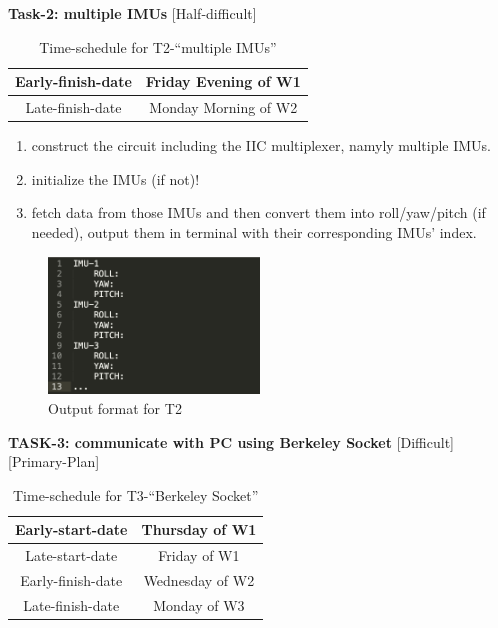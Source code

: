 \documentclass[11pt, a4paper]{article}
\begin{document}
\textbf{Task-2: multiple IMUs} 	[Half-difficult]
\begin{table}[!ht]
	\centering
	\caption{Time-schedule for T2-``multiple IMUs''}
	\begin{tabular}{|c|c|}
		\hline
		Early-finish-date & Friday Evening of W1 \\ \hline
		Late-finish-date & Monday Morning of W2 \\ \hline
	\end{tabular}
	\label{tab:HD_TASK_2}
\end{table}

\begin{enumerate}
	\item construct the circuit including the IIC multiplexer, namyly multiple IMUs.
	\item initialize the IMUs (if not)!
	\item fetch data from those IMUs and then convert them into roll/yaw/pitch (if needed), output them in terminal with their corresponding IMUs' index.
\end{enumerate}

\begin{figure}[htbp]
	\centering
	\includegraphics[width=0.5\textwidth]{
		fileForWriting/OUTPUT_FORMAT_T2}
	\caption{Output format for T2}
	\label{fig:OUTPUT_FORMAT_T2}
\end{figure}

\textbf{TASK-3: communicate with PC using Berkeley Socket} 	[Difficult] [Primary-Plan]

\begin{table}[!ht]
	\centering
	\caption{Time-schedule for T3-``Berkeley Socket''}
	\begin{tabular}{|c|c|}
		\hline
		Early-start-date & Thursday of W1 \\ \hline
		Late-start-date & Friday of W1 \\ \hline
		Early-finish-date & Wednesday of W2 \\ \hline
		Late-finish-date & Monday of W3 \\ \hline
	\end{tabular}
	\label{tab:HD_TASK_3}
\end{table}
\end{document}
